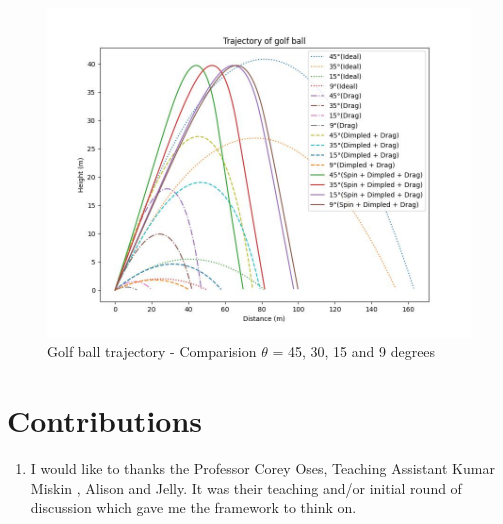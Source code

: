 \documentclass[11pt]{article}
\begin{document}
\begin{figure}[b]
    \centering
    \includegraphics[width=\textwidth, height=\textheight, keepaspectratio]{Golf_Trajectory.jpeg}
    \caption{Golf ball trajectory - Comparision $\theta$ = 45, 30, 15 and 9 degrees}
    \label{fig:trajectory}
\end{figure}
\section{Contributions}
\begin{enumerate}
    \item I would like to thanks the Professor Corey Oses, Teaching Assistant Kumar Miskin , Alison and Jelly. It was their  teaching and/or initial round of discussion which gave me the framework to think on.
\end{enumerate}

  
\end{document}
